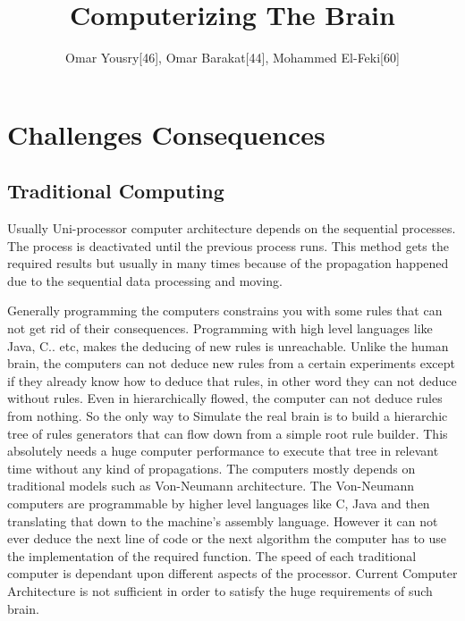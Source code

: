 \documentclass{article}
\title{Computerizing The Brain}
\author{Omar Yousry[46], Omar Barakat[44], Mohammed El-Feki[60]}
\begin{document}
\maketitle

\newpage

\tableofcontents

\newpage


\section*{Challenges Consequences}
\subsection*{Traditional Computing}
Usually Uni-processor computer architecture depends on the sequential processes. The process is deactivated until the previous process runs. This method gets the required results but usually in many times because of the propagation happened due to the sequential data processing and moving.


\newline Generally programming the computers constrains you with some rules that can not get rid of their consequences. Programming with high level languages like Java, C.. etc, makes the deducing of new rules is unreachable. Unlike the human brain, the computers can not deduce new rules from a certain experiments except if they already know how to deduce that rules, in other word they can not deduce without rules. Even in hierarchically flowed, the computer can not deduce rules from nothing. So the only way to Simulate the real brain is to build a hierarchic tree of rules generators that can flow down from a simple root rule builder. This absolutely needs a huge computer performance to execute that tree in relevant time without any kind of propagations.
The computers mostly depends on traditional models such as Von-Neumann architecture. The Von-Neumann computers are programmable by higher level languages like C, Java and then translating that down to the machine's assembly language. However it can not ever deduce the next line of code or the next algorithm the computer has to use the implementation of the required function.
The speed of each traditional computer is dependant upon different aspects of the processor. 
Current Computer Architecture is not sufficient in order to satisfy the huge requirements of such brain.
\end{document}
